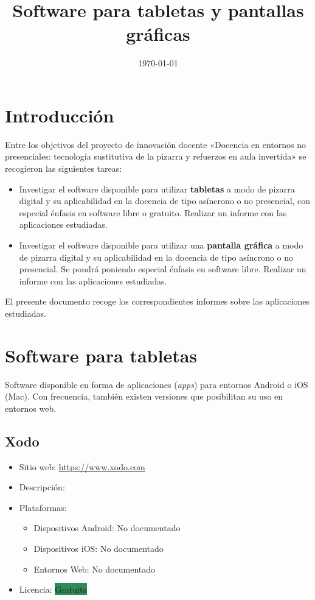 \documentclass[11pt]{article}
\title{Software para tabletas y pantallas gráficas}
\date{\today}
\newcommand{\nodoc}{No documentado}
\newcommand{\gratis}{\colorbox{SeaGreen}{Gratuita}}
\begin{document}
\maketitle

\section{Introducción}
Entre los objetivos del proyecto de innovación docente «Docencia en
entornos no presenciales: tecnología sustitutiva de la pizarra y
refuerzos en aula invertida» se recogieron las siguientes tareas:

\begin{itemize}
\item Investigar el software disponible para utilizar
  \textbf{tabletas} a modo de pizarra digital y su aplicabilidad en la
  docencia de tipo asíncrono o no presencial, con especial énfasis en
  software libre o gratuito. Realizar un informe con las aplicaciones
  estudiadas.

\item Investigar el software disponible para utilizar una \textbf{pantalla
  gráfica} a modo de pizarra digital y su aplicabilidad en la docencia
  de tipo asíncrono o no presencial. Se pondrá poniendo especial
  énfasis en software libre. Realizar un informe con las aplicaciones
  estudiadas.
\end{itemize}

El presente documento recoge los correspondientes informes sobre las aplicaciones estudiadas.

\section{Software para tabletas}

Software disponible en forma de aplicaciones (\textit{apps}) para
entornos Android o iOS (Mac). Con frecuencia, también existen
versiones que posibilitan su uso en entornos web.

\subsection{Xodo}

\begin{itemize}
\item Sitio web: \url{https://www.xodo.com}
\item Descripción:
\item Plataformas:
  \begin{itemize}
  \item Dispositivos Android: \nodoc
  \item Dispositivos iOS: \nodoc
  \item Entornos Web: \nodoc
  \end{itemize}
\item Licencia: \gratis
\end{itemize}
\end{document}
